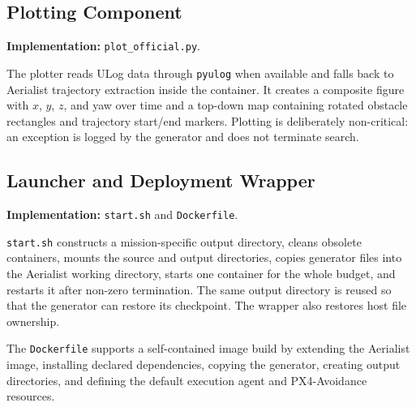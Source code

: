 \documentclass[11pt,a4paper,openany]{report}
\newcommand{\code}[1]{\texttt{#1}}
\begin{document}
\subsection{Plotting Component}
\textbf{Implementation:} \code{plot\_official.py}.

The plotter reads ULog data through \code{pyulog} when available and falls back to Aerialist trajectory extraction inside the container. It creates a composite figure with $x$, $y$, $z$, and yaw over time and a top-down map containing rotated obstacle rectangles and trajectory start/end markers. Plotting is deliberately non-critical: an exception is logged by the generator and does not terminate search.

\subsection{Launcher and Deployment Wrapper}
\textbf{Implementation:} \code{start.sh} and \code{Dockerfile}.

\code{start.sh} constructs a mission-specific output directory, cleans obsolete containers, mounts the source and output directories, copies generator files into the Aerialist working directory, starts one container for the whole budget, and restarts it after non-zero termination. The same output directory is reused so that the generator can restore its checkpoint. The wrapper also restores host file ownership.

The \code{Dockerfile} supports a self-contained image build by extending the Aerialist image, installing declared dependencies, copying the generator, creating output directories, and defining the default execution agent and PX4-Avoidance resources.
\end{document}
